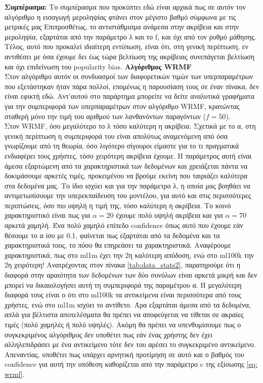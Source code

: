 \textbf{Συμπέρασμα:} Το συμπέρασμα που προκύπτει εδώ είναι αρχικά πως σε αυτόν τον αλγόριθμο η εισαγωγή μεροληψίας φτάνει στον μέγιστο βαθμό σύμφωνα με τις μετρικές μας Επιπροσθέτως, το αντιστάθμισμα ανάμεσα στην ακρίβεια και στην μεροληψία, εξαρτάται από την παράμετρο λ και το f, και όχι από τον ρυθμό μάθησης. Τέλος, αυτό που προκαλεί ιδιαίτερη εντύπωση, είναι ότι, στη γενική περίπτωση, εν αντιθέσει με όσα έχουμε δει έως τώρα βελτίωση της ακρίβειας συνεπάγεται βελτίωση και όχι επιδείνωση του popularity bias.
\newpage
\noindent\textbf{Αλγόριθμος WRMF}\\
Στον αλγόριθμο αυτόν οι συνδυασμοί των διαφορετικών τιμών των υπερπαραμέτρων που εξετάστηκαν ήταν πάρα πολλοί, επομένως η παρουσίαση τους σε έναν πίνακα, δεν είναι εφικτή εδώ. Αντ'αυτού στο παράρτημα μπορείτε να δείτε αναλυτικά γραφήματα για την συμπεριφορά των υπερπαραμέτρων στον αλγόριθμο WRMF, κρατώντας σταθερή μόνο την τιμή του αριθμού των λανθανόντων παραγόντων ($ f=50 $).\\
Στον WRMF, όσο μεγαλύτερο το λ τόσο καλύτερη η ακρίβεια. Σχετικά με το α, στη γενική περίπτωση η συμπεριφορά του είναι απολύτως αναμενόμενη από όσα γνωρίζουμε από τη θεωρία, όσο λιγότερο σίγουροι είμαστε για το τι πραγματικά ενδιαφέρει τους χρήστες, τόσο χειρότερη ακρίβεια έχουμε. Η παράμετρος αυτή είναι άμεσα εξαρτώμενη από τα χαρακτηριστικά των δεδομένων και χρειάζεται πάντα να δοκιμάσουμε αρκετές τιμές, προκειμένου να βρούμε εκείνη που ταιριάζει καλύτερα στα δεδομένα μας.
Το ίδιο ισχύει και για την παράμετρο λ, η οποία μας βοηθάει να αντιμετωπίσουμε την υπερεκπαίδευση του μοντέλου, για αυτό και στις περισσότερες περιπτώσεις, όσο πιο υψηλή η τιμή της, τόσο καλύτερη η ακρίβεια. Το κοινό χαρακτηριστικό είναι πως για $ α=20 $ έχουμε πολύ υψηλή ακρίβεια και για $ α=70 $ αρκετά χαμηλή. Ένα πολύ χαμηλό επίπεδο confidence όπως αυτό που έχουμε εάν θέσουμε το α ίσο με 0.1, φαίνεται πως εξαρτάται από τα δεδομένα και τα χαρακτηριστικά τους, το πόσο θα επηρεάσει τα χαρακτηριστικά. Αναφέρουμε χαρακτηριστικά, πως στο ml1m έχει την 2η καλύτερη απόδοση, ενώ στο ml100k την 2η χειρότερη! Ανατρέχοντας στον πίνακα \ref{tab:data_stats2}, παρατηρούμε ότι η διαφορά στην αραιότητα των δεδομένων των δύο συνόλων είναι αρκετά μικρή και δεν μπορεί να δικαιολογήσει αυτή τη συμπεριφορά της παραμέτρου α. Η μεγαλύτερη διαφορά τους είναι ο ότι στο ml100k τα αντικείμενα είναι περισσότερα από τους χρήστες, ενώ στο ml1m ισχύει το αντίθετο. Άρα εξαρτάται άμεσα από τα δεδομένα, απλά για βέλτιστα αποτελέσματα θα πρέπει να αποφεύγεται να τίθεται σε ακραίες τιμές (πολύ χαμηλές ή πολύ υψηλές). Ακόμη θα πρέπει να υπενθυμίσουμε πως ο συγκεκριμένος αλγόριθμος\textit{ δεν} υποθέτει πως εάν ένας χρήστης δεν έχει αλληλεπιδράσει με ένα αντικείμενο τότε δεν του αρέσει το συγκεκριμένο αντικείμενο. Απεναντίας, υποθέτει πως υπάρχει αρνητική προτίμηση σε αυτό και ο βαθμός του confidence για αυτή την υπόθεση καθορίζεται από την παράμετρο c της εξίσωσης \eqref{eq: wrmf}.\\
